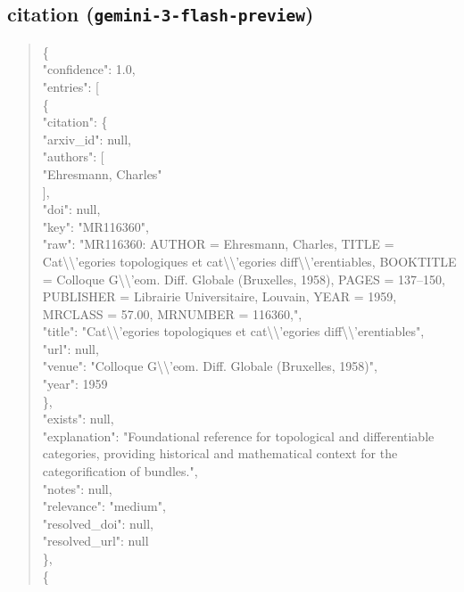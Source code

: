 \documentclass[11pt]{article}
\begin{document}
\subsection*{citation (\texttt{gemini-3-flash-preview})}
\begin{quote}\small\ttfamily\raggedright
\{\\
  "confidence": 1.0,\\
  "entries": [\\
    \{\\
      "citation": \{\\
        "arxiv\_id": null,\\
        "authors": [\\
          "Ehresmann, Charles"\\
        ],\\
        "doi": null,\\
        "key": "MR116360",\\
        "raw": "MR116360: AUTHOR = Ehresmann, Charles, TITLE = Cat\textbackslash{}\textbackslash{}'egories topologiques et cat\textbackslash{}\textbackslash{}'egories diff\textbackslash{}\textbackslash{}'erentiables, BOOKTITLE = Colloque G\textbackslash{}\textbackslash{}'eom. Diff. Globale (Bruxelles, 1958), PAGES = 137--150, PUBLISHER = Librairie Universitaire, Louvain, YEAR = 1959, MRCLASS = 57.00, MRNUMBER = 116360,",\\
        "title": "Cat\textbackslash{}\textbackslash{}'egories topologiques et cat\textbackslash{}\textbackslash{}'egories diff\textbackslash{}\textbackslash{}'erentiables",\\
        "url": null,\\
        "venue": "Colloque G\textbackslash{}\textbackslash{}'eom. Diff. Globale (Bruxelles, 1958)",\\
        "year": 1959\\
      \},\\
      "exists": null,\\
      "explanation": "Foundational reference for topological and differentiable categories, providing historical and mathematical context for the categorification of bundles.",\\
      "notes": null,\\
      "relevance": "medium",\\
      "resolved\_doi": null,\\
      "resolved\_url": null\\
    \},\\
    \{\\

\end{quote}
\end{document}
